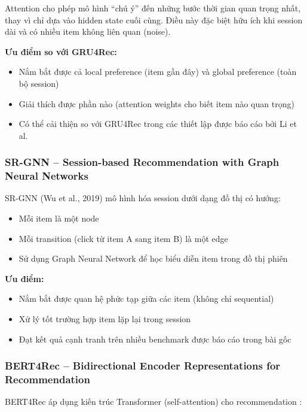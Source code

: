 \documentclass[12pt, a4paper]{article}
\begin{document}
Attention cho phép mô hình ``chú ý'' đến những bước thời gian quan trọng nhất, thay vì chỉ dựa vào hidden state cuối cùng. Điều này đặc biệt hữu ích khi session dài và có nhiều item không liên quan (noise).

\textbf{Ưu điểm so với GRU4Rec:}
\begin{itemize}
    \item Nắm bắt được cả local preference (item gần đây) và global preference (toàn bộ session)
    \item Giải thích được phần nào (attention weights cho biết item nào quan trọng)
    \item Có thể cải thiện so với GRU4Rec trong các thiết lập được báo cáo bởi Li et al. \cite{li2017}
\end{itemize}

\subsubsection{SR-GNN -- Session-based Recommendation with Graph Neural Networks}

SR-GNN (Wu et al., 2019) \cite{wu2019} mô hình hóa session dưới dạng đồ thị có hướng:

\begin{itemize}
    \item Mỗi item là một node
    \item Mỗi transition (click từ item A sang item B) là một edge
    \item Sử dụng Graph Neural Network để học biểu diễn item trong đồ thị phiên
\end{itemize}

\textbf{Ưu điểm:}
\begin{itemize}
    \item Nắm bắt được quan hệ phức tạp giữa các item (không chỉ sequential)
    \item Xử lý tốt trường hợp item lặp lại trong session
    \item Đạt kết quả cạnh tranh trên nhiều benchmark được báo cáo trong bài gốc \cite{wu2019}
\end{itemize}

\subsubsection{BERT4Rec -- Bidirectional Encoder Representations for Recommendation}

BERT4Rec áp dụng kiến trúc Transformer (self-attention) cho recommendation \cite{sun2019, vaswani2017}:
\end{document}
